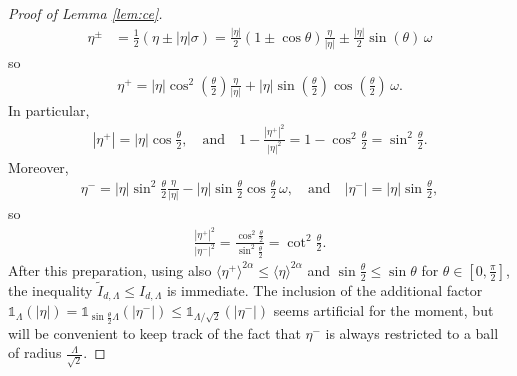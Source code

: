 \documentclass[11pt,a4paper,reqno]{amsart}
\theoremstyle{plain}
\theoremstyle{definition}
\begin{document}
\begin{proof}[Proof of Lemma \ref{lem:ce}]
\begin{align*}
 	\eta^\pm
 		&= \frac{1}{2} (\eta\pm |\eta|\sigma)
 		 = \frac{|\eta|}{2}(1\pm \cos\theta) \frac{\eta}{|\eta|} \pm \frac{|\eta|}{2} \sin(\theta)\, \omega
 \end{align*}
  so
  \begin{align*}
  	\eta^+ = |\eta| \cos^2(\tfrac{\theta}{2}) \frac{\eta}{|\eta|} + |\eta| \sin(\tfrac{\theta}{2})\cos(\tfrac{\theta}{2})\, \omega .
  \end{align*}
  In particular,
  \begin{align*}
  	|\eta^+| = |\eta| \cos\frac{\theta}{2}, \quad \text{and} \quad 1-\frac{|\eta^+|^2}{|\eta|^2} = 1-\cos^2\frac{\theta}{2} = \sin^2\frac{\theta}{2}.
  \end{align*}
  Moreover,
  \begin{align*}
  		\eta^- = |\eta| \sin^2\frac{\theta}{2} \frac{\eta}{|\eta|} - |\eta| \sin\frac{\theta}{2}\cos\frac{\theta}{2}\, \omega, \quad \text{and} \quad 	|\eta^-| = |\eta| \sin\frac{\theta}{2} ,
  \end{align*}
  so
  \begin{align*}
  	\frac{|\eta^+|^2}{|\eta^-|^2} = \frac{\cos^2\frac{\theta}{2}}{\sin^2\frac{\theta}{2}}
  		= \cot^2\frac{\theta}{2} .
  \end{align*}
After this preparation, using also $\langle \eta^+\rangle^{2\alpha} \leq  \langle \eta\rangle^{2\alpha}$ and $\sin\frac{\theta}{2} \leq \sin \theta$ for $\theta\in[0, \frac{\pi}{2}]$, the inequality $\widetilde{I}_{d,\Lambda}\le I_{d,\Lambda}$ is immediate. The inclusion of the additional factor ${\mathds{1}}_{\Lambda}(|\eta|) = {\mathds{1}}_{\sin\frac{\theta}{2} \Lambda}(|\eta^-|) \leq {\mathds{1}}_{\Lambda/\sqrt{2}}(|\eta^-|)$ seems artificial for the moment, but will be convenient to keep track of the fact that $\eta^-$ is always restricted to a ball of radius $\tfrac{\Lambda}{\sqrt{2}}$.
	


\end{proof}
\end{document}
